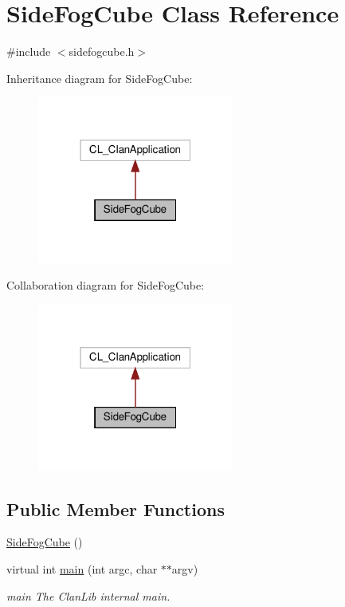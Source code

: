 \hypertarget{classSideFogCube}{}\section{Side\+Fog\+Cube Class Reference}
\label{classSideFogCube}


{\ttfamily \#include $<$sidefogcube.\+h$>$}



Inheritance diagram for Side\+Fog\+Cube\+:
\nopagebreak
\begin{figure}[H]
\begin{center}
\leavevmode
\includegraphics[width=183pt]{d4/dfd/classSideFogCube__inherit__graph}
\end{center}
\end{figure}


Collaboration diagram for Side\+Fog\+Cube\+:
\nopagebreak
\begin{figure}[H]
\begin{center}
\leavevmode
\includegraphics[width=183pt]{da/da8/classSideFogCube__coll__graph}
\end{center}
\end{figure}
\subsection*{Public Member Functions}
\begin{DoxyCompactItemize}
\item 
\hyperlink{classSideFogCube_af3f3ad8ae933d9275fb7b761c55d31fd}{Side\+Fog\+Cube} ()
\item 
virtual int \hyperlink{classSideFogCube_a54448225b0c51ba310629e606d4f512d}{main} (int argc, char $\ast$$\ast$argv)
\begin{DoxyCompactList}\small\item\em main The Clan\+Lib internal main. \end{DoxyCompactList}\end{DoxyCompactItemize}


